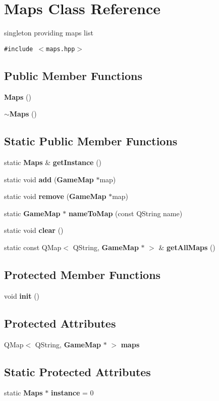 \section{Maps Class Reference}
\label{classMaps}
singleton providing maps list  


{\tt \#include $<$maps.hpp$>$}

\subsection*{Public Member Functions}
\begin{CompactItemize}
\item 
{\bf Maps} ()
\item 
{\bf $\sim$Maps} ()
\end{CompactItemize}
\subsection*{Static Public Member Functions}
\begin{CompactItemize}
\item 
static {\bf Maps} \& {\bf get\-Instance} ()
\item 
static void {\bf add} ({\bf Game\-Map} $\ast$map)
\item 
static void {\bf remove} ({\bf Game\-Map} $\ast$map)
\item 
static {\bf Game\-Map} $\ast$ {\bf name\-To\-Map} (const QString name)
\item 
static void {\bf clear} ()
\item 
static const QMap$<$ QString, {\bf Game\-Map} $\ast$ $>$ \& {\bf get\-All\-Maps} ()
\end{CompactItemize}
\subsection*{Protected Member Functions}
\begin{CompactItemize}
\item 
void {\bf init} ()
\end{CompactItemize}
\subsection*{Protected Attributes}
\begin{CompactItemize}
\item 
QMap$<$ QString, {\bf Game\-Map} $\ast$ $>$ {\bf maps}
\end{CompactItemize}
\subsection*{Static Protected Attributes}
\begin{CompactItemize}
\item 
static {\bf Maps} $\ast$ {\bf instance} = 0
\end{CompactItemize}


